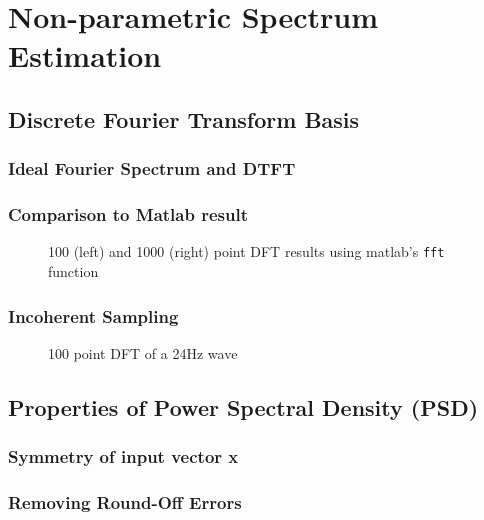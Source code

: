 \documentclass[main.tex]{subfiles}
\begin{document}
\section{Non-parametric Spectrum Estimation}

\subsection{Discrete Fourier Transform Basis}

\subsubsection{Ideal Fourier Spectrum and DTFT}

\subsubsection{Comparison to Matlab result}

\begin{figure}[H]
	\centering 
	\resizebox{0.8\textwidth}{!}{}
	\caption{100 (left) and 1000 (right) point DFT results using matlab's {\tt fft} function}
	\label{fig:q1_1_b}
\end{figure}


\subsubsection{Incoherent Sampling}


\begin{figure}[H]
	\centering 
	\resizebox{0.8\textwidth}{!}{}
	\caption{100 point DFT of a 24Hz wave}
	\label{fig:q1_1_c}
\end{figure}






\subsection{Properties of Power Spectral Density (PSD)}


\subsubsection{Symmetry of input vector x}

\subsubsection{Removing Round-Off Errors}
\end{document}
